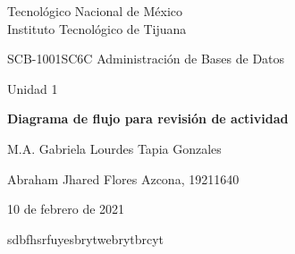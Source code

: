     \begin{titlepage}
        \centering
        {\Large Tecnológico Nacional de México\\Instituto Tecnológico de Tijuana\par}
        \vspace{1cm}
        {\Large SCB-1001SC6C Administración de Bases de Datos\par}
        \vspace{1cm}
        {\Large Unidad 1\par}
        \vspace{1.5cm}
        {\Large\bfseries Diagrama de flujo para revisión de actividad\par}
        \vspace{2cm}
        {\large M.A. Gabriela Lourdes Tapia Gonzales\par}
        \vfill
            {\large Abraham Jhared Flores Azcona, 19211640\par}
        \vfill
        {\large 10 de febrero de 2021}
    \end{titlepage}


    sdbfhsrfuyesbrytwebrytbrcyt

